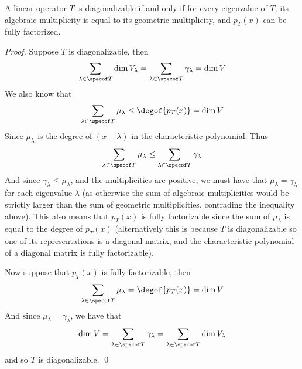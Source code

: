\begin{thrm*}

    A linear operator $T$ is diagonalizable if and only if for every eigenvalue of $T$, its algebraic multiplicity is equal to its geometric multiplicity, and $p_T(x)$ can be fully factorized.

\end{thrm*}

\begin{proof}

    Suppose $T$ is diagonalizable, then
    \[ \sum_{\lambda\in\specof T}\dim V_\lambda = \sum_{\lambda\in\specof T}\gamma_\lambda = \dim V \]
    We also know that
    \[ \sum_{\lambda\in\specof T}\mu_\lambda \leq \degof{p_T(x)} = \dim V \]
    Since $\mu_\lambda$ is the degree of $(x-\lambda)$ in the characteristic polynomial.
    Thus
    \[ \sum_{\lambda\in\specof T}\mu_\lambda \leq \sum_{\lambda\in\specof T}\gamma_\lambda \]
    And since $\gamma_\lambda\leq\mu_\lambda$, and the multiplicities are positive, we must have that $\mu_\lambda=\gamma_\lambda$ for each eigenvalue $\lambda$ (as otherwise the sum of algebraic
    multiplicities would be strictly larger than the sum of geometric multiplicities, contrading the inequality above).
    This also means that $p_T(x)$ is fully factorizable since the sum of $\mu_\lambda$ is equal to the degree of $p_T(x)$ (alternatively this is because $T$ is diagonalizable so one of its representations
    is a diagonal matrix, and the characteristic polynomial of a diagonal matrix is fully factorizable).

    Now suppose that $p_T(x)$ is fully factorizable, then
    \[ \sum_{\lambda\in\specof T}\mu_\lambda = \degof{p_T(x)} = \dim V \]
    And since $\mu_\lambda=\gamma_\lambda$, we have that
    \[ \dim V = \sum_{\lambda\in\specof T}\gamma_\lambda = \sum_{\lambda\in\specof T}\dim V_\lambda \]
    and so $T$ is diagonalizable.
    \qed

\end{proof}

